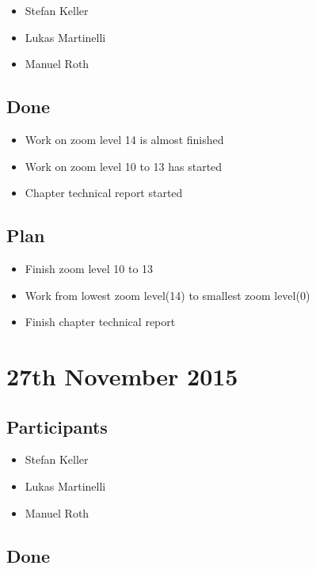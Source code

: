 \begin{itemize}
  \item Stefan Keller
  \item Lukas Martinelli
  \item Manuel Roth
\end{itemize}

\subsection*{Done}

\begin{itemize}
  \item Work on zoom level 14 is almost finished
  \item Work on zoom level 10 to 13 has started
  \item Chapter technical report started
\end{itemize}

\subsection*{Plan}

\begin{itemize}
  \item Finish zoom level 10 to 13
  \item Work from lowest zoom level(14) to smallest zoom level(0)
  \item Finish chapter technical report
\end{itemize}

\section*{27th November 2015}

\subsection*{Participants}

\begin{itemize}
  \item Stefan Keller
  \item Lukas Martinelli
  \item Manuel Roth
\end{itemize}

\subsection*{Done}

